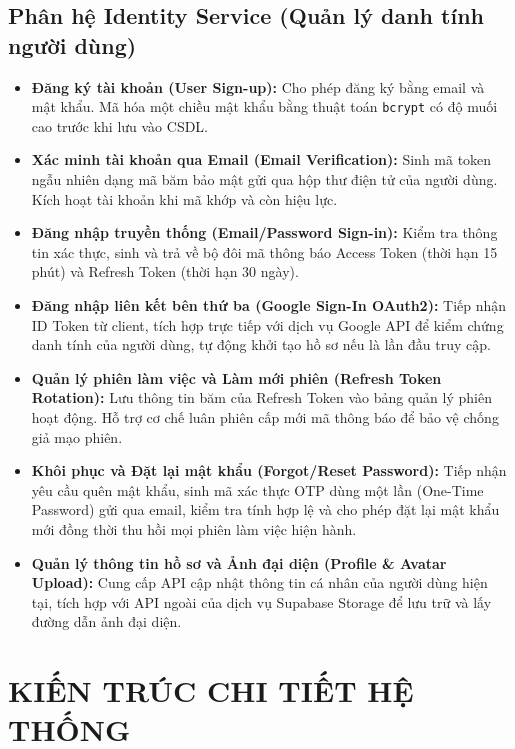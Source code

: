 \documentclass[14pt,a4paper,oneside]{extreport}
\begin{document}
\section{Phân hệ Identity Service (Quản lý danh tính người dùng)}
\begin{itemize}[leftmargin=1.5cm]
  \item \textbf{Đăng ký tài khoản (User Sign-up):} Cho phép đăng ký bằng email và mật khẩu. Mã hóa một chiều mật khẩu bằng thuật toán \texttt{bcrypt} có độ muối cao trước khi lưu vào CSDL.
  \item \textbf{Xác minh tài khoản qua Email (Email Verification):} Sinh mã token ngẫu nhiên dạng mã băm bảo mật gửi qua hộp thư điện tử của người dùng. Kích hoạt tài khoản khi mã khớp và còn hiệu lực.
  \item \textbf{Đăng nhập truyền thống (Email/Password Sign-in):} Kiểm tra thông tin xác thực, sinh và trả về bộ đôi mã thông báo Access Token (thời hạn 15 phút) và Refresh Token (thời hạn 30 ngày).
  \item \textbf{Đăng nhập liên kết bên thứ ba (Google Sign-In OAuth2):} Tiếp nhận ID Token từ client, tích hợp trực tiếp với dịch vụ Google API để kiểm chứng danh tính của người dùng, tự động khởi tạo hồ sơ nếu là lần đầu truy cập.
  \item \textbf{Quản lý phiên làm việc và Làm mới phiên (Refresh Token Rotation):} Lưu thông tin băm của Refresh Token vào bảng quản lý phiên hoạt động. Hỗ trợ cơ chế luân phiên cấp mới mã thông báo để bảo vệ chống giả mạo phiên.
  \item \textbf{Khôi phục và Đặt lại mật khẩu (Forgot/Reset Password):} Tiếp nhận yêu cầu quên mật khẩu, sinh mã xác thực OTP dùng một lần (One-Time Password) gửi qua email, kiểm tra tính hợp lệ và cho phép đặt lại mật khẩu mới đồng thời thu hồi mọi phiên làm việc hiện hành.
  \item \textbf{Quản lý thông tin hồ sơ và Ảnh đại diện (Profile \& Avatar Upload):} Cung cấp API cập nhật thông tin cá nhân của người dùng hiện tại, tích hợp với API ngoài của dịch vụ Supabase Storage để lưu trữ và lấy đường dẫn ảnh đại diện.
\end{itemize}

\chapter{KIẾN TRÚC CHI TIẾT HỆ THỐNG}
\label{chap:kien-truc-chi-tiet}
\end{document}
